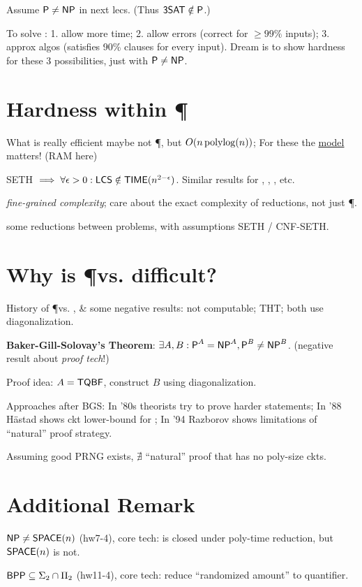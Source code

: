 \documentclass{article}
\begin{document}
Assume $\text{\sf P} \neq \text{\sf NP}$ in next lecs. (Thus $\text{\sf 3SAT} \notin \text{\sf P}$.)
\par
To solve :
1. allow more time;
2. allow errors (correct for $\geq 99\%$ inputs);
3. approx algos (satisfies 90\% clauses for every input).
Dream is to show hardness for these 3 possibilities, just with $\text{\sf P} \neq \text{\sf NP}$.


\section{Hardness within \P}

What is really efficient maybe not \P, but $O(n \operatorname{polylog}(n))$;
For these the \ul{model} matters! (RAM here)
\par
SETH $\implies \forall \epsilon>0: \text{\sf LCS} \notin \text{\sf TIME}(n^{2-\epsilon})$. Similar results for , , , etc.
\par
\textit{fine-grained complexity};
care about the exact complexity of reductions, not just \P.
\par
some reductions between problems, with assumptions SETH / CNF-SETH.


\section{Why is \P vs. \NP difficult?}

History of \P vs. \NP, \& some negative results:  not computable; THT; both use diagonalization.
\par
\textbf{Baker-Gill-Solovay's Theorem}: $\exists A, B: \text{\sf P}^A = \text{\sf NP}^A, \text{\sf P}^B \neq \text{\sf NP}^B$. (negative result about \textit{proof tech}!)
\par
Proof idea: $A = \text{\sf TQBF}$, construct $B$ using diagonalization.
\par
Approaches after BGS:
In '80s theorists try to prove harder statements;
In '88 Hästad shows ckt lower-bound for ;
In '94 Razborov shows limitations of ``natural'' proof strategy.
\par
Assuming good PRNG exists, $\nexists$ ``natural'' proof that \NP has no poly-size ckts.


\section{Additional Remark}

$\text{\sf NP} \neq \text{\sf SPACE}(n)$ (hw7-4), core tech: \NP is closed under poly-time reduction, but $\text{\sf SPACE}(n)$ is not.
\par
[Sipser-Lautemann] $\text{\sf BPP} \subseteq \Sigma_2 \cap \Pi_2$ (hw11-4), core tech: reduce ``randomized amount'' to quantifier.
\end{document}
